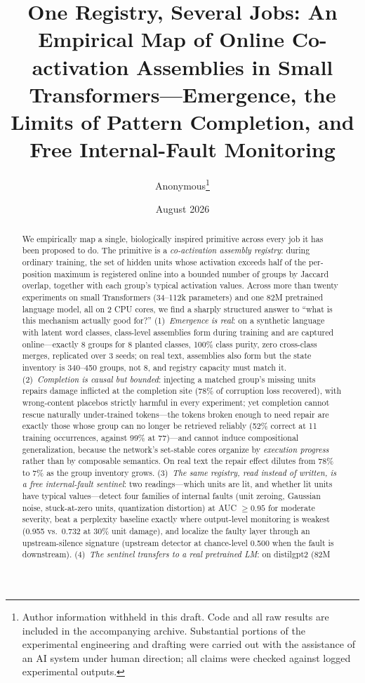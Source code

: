 \documentclass[11pt]{article}
\title{One Registry, Several Jobs: An Empirical Map of Online Co-activation
Assemblies in Small Transformers---Emergence, the Limits of Pattern Completion,
and Free Internal-Fault Monitoring}
\author{Anonymous\thanks{Author information withheld in this draft. Code and all
raw results are included in the accompanying archive. Substantial portions of
the experimental engineering and drafting were carried out with the assistance
of an AI system under human direction; all claims were checked against logged
experimental outputs.}}
\date{August 2026}
\begin{document}
\maketitle

\begin{abstract}
We empirically map a single, biologically inspired primitive across every job it
has been proposed to do. The primitive is a \emph{co-activation assembly
registry}: during ordinary training, the set of hidden units whose activation
exceeds half of the per-position maximum is registered online into a bounded
number of groups by Jaccard overlap, together with each group's typical
activation values. Across more than twenty experiments on small Transformers
(34--112k parameters) and one 82M pretrained language model, all on 2 CPU
cores, we find a sharply structured answer to ``what is this mechanism actually
good for?''
(1)~\emph{Emergence is real}: on a synthetic language with latent word classes,
class-level assemblies form during training and are captured online---exactly 8
groups for 8 planted classes, 100\% class purity, zero cross-class merges,
replicated over 3 seeds; on real text, assemblies also form but the state
inventory is 340--450 groups, not 8, and registry capacity must match it.
(2)~\emph{Completion is causal but bounded}: injecting a matched group's missing
units repairs damage inflicted at the completion site (78\% of corruption loss
recovered), with wrong-content placebos strictly harmful in every experiment;
yet completion cannot rescue naturally under-trained tokens---the tokens broken
enough to need repair are exactly those whose group can no longer be retrieved
reliably (52\% correct at 11 training occurrences, against 99\% at 77)---and cannot induce
compositional generalization, because the network's set-stable cores organize by
\emph{execution progress} rather than by composable semantics. On real text the
repair effect dilutes from 78\% to 7\% as the group inventory grows.
(3)~\emph{The same registry, read instead of written, is a free internal-fault
sentinel}: two readings---which units are lit, and whether lit units have
typical values---detect four families of internal faults (unit zeroing, Gaussian
noise, stuck-at-zero units, quantization distortion) at AUC $\ge 0.95$ for
moderate severity, beat a perplexity baseline exactly where output-level
monitoring is weakest (0.955 vs.\ 0.732 at 30\% unit damage), and localize the
faulty layer through an upstream-silence signature (upstream detector at
chance-level 0.500 when the fault is downstream). (4)~\emph{The sentinel transfers to a real pretrained LM}: on distilgpt2 (82M

\end{abstract}
\end{document}
